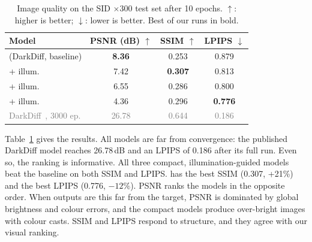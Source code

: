 \begin{table}[t]
  \centering
  \caption{Image quality on the SID $\times300$ test set after 10 epochs.
  $\uparrow$: higher is better; $\downarrow$: lower is better. Best of our runs in bold.}
  \label{tab:quality}
  \setlength{\tabcolsep}{5pt}
  \begin{tabular}{@{}lccc@{}}
    \toprule
    Model & PSNR (dB) $\uparrow$ & SSIM $\uparrow$ & LPIPS $\downarrow$ \\
    \midrule
    \sdtwo{} (DarkDiff, baseline) & \textbf{8.36} & 0.253          & 0.879 \\
    \bksdm{} + illum.             & 7.42          & \textbf{0.307} & 0.813 \\
    \sdxs{} + illum.              & 6.55          & 0.286          & 0.800 \\
    \tinysd{} + illum.            & 4.36          & 0.296          & \textbf{0.776} \\
    \midrule
    \textcolor{gray}{DarkDiff~\cite{zheng2025darkdiff}, 3000 ep.} &
    \textcolor{gray}{26.78} & \textcolor{gray}{0.644} & \textcolor{gray}{0.186} \\
    \bottomrule
  \end{tabular}
\end{table}

Table~\ref{tab:quality} gives the results. All models are far from convergence: the
published DarkDiff model reaches 26.78\,dB and an LPIPS of 0.186 after its full run. Even so,
the ranking is informative. All three compact, illumination-guided models beat the \sdtwo{}
baseline on both SSIM and LPIPS. \bksdm{} has the best SSIM (0.307, +21\%) and \tinysd{} the
best LPIPS (0.776, $-12\%$). PSNR ranks the models in the opposite order. When outputs are this
far from the target, PSNR is dominated by global brightness and colour errors, and the compact
models produce over-bright images with colour casts. SSIM and LPIPS respond to structure, and
they agree with our visual ranking.

